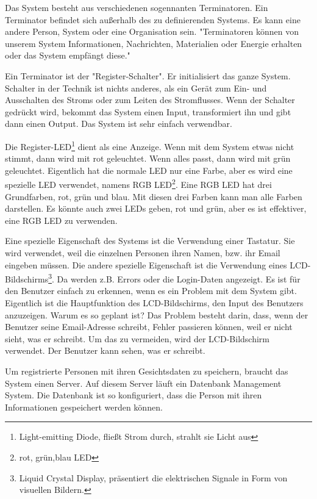 Das System besteht aus verschiedenen sogennanten Terminatoren.
Ein  Terminator  befindet  sich  au{\ss}erhalb  des  zu  definierenden  Systems.  Es  kann  eine andere Person, System oder eine Organisation sein. "Terminatoren k\"onnen von unserem System Informationen, Nachrichten, Materialien oder Energie erhalten oder das System empf\"angt diese."\cite{terminator}

Ein Terminator ist der "Register-Schalter". Er initialisiert das ganze System. Schalter in der Technik ist nichts anderes, als ein Ger\"at zum Ein- und Ausschalten des Stroms oder zum Leiten des Stromflusses. Wenn der Schalter gedr\"uckt wird, bekommt das System einen Input, transformiert ihn und gibt dann einen Output. Das System ist sehr einfach verwendbar.

Die Register-LED\footnote{Light-emitting Diode, flie{\ss}t Strom durch, strahlt sie Licht aus} dient als eine Anzeige. Wenn mit dem System etwas nicht stimmt, dann wird mit rot geleuchtet. Wenn alles passt, dann wird mit gr\"un geleuchtet. Eigentlich hat die normale LED nur eine Farbe, aber es wird eine spezielle LED verwendet, namens RGB LED\footnote{rot, gr\"un,blau LED}. Eine RGB LED hat drei Grundfarben, rot, gr\"un und blau. Mit diesen drei Farben kann man alle Farben darstellen. Es k\"onnte auch zwei LEDs geben, rot und gr\"un, aber es ist effektiver, eine RGB LED zu verwenden.


Eine spezielle Eigenschaft des Systems ist die Verwendung einer Tastatur. Sie wird verwendet, weil die einzelnen Personen ihren Namen, bzw. ihr Email eingeben m\"ussen. 
Die andere spezielle Eigenschaft ist die Verwendung eines LCD-Bildschirms\footnote{Liquid Crystal Display, präsentiert die elektrischen Signale in Form von visuellen Bildern.}. Da werden z.B. Errors oder die Login-Daten angezeigt. Es ist f\"ur den Benutzer einfach zu erkennen, wenn es ein Problem mit dem System gibt. Eigentlich ist die Hauptfunktion des LCD-Bildschirms, den Input des Benutzers anzuzeigen. Warum es so geplant ist? Das Problem besteht darin, dass, wenn der Benutzer seine Email-Adresse schreibt, Fehler passieren k\"onnen, weil er nicht sieht, was er schreibt. Um das zu vermeiden, wird der LCD-Bildschirm verwendet. Der Benutzer kann sehen, was er schreibt.

Um registrierte Personen mit ihren Gesichtsdaten zu speichern, braucht das System einen Server. Auf diesem Server l\"auft ein Datenbank Management System. Die Datenbank ist so konfiguriert, dass die Person mit ihren Informationen gespeichert werden k\"onnen. 

